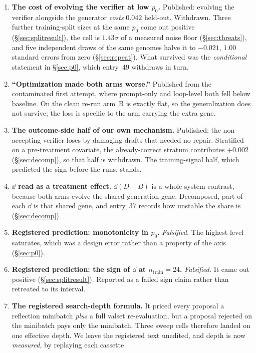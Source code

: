 \documentclass[11pt]{article}
\begin{document}
\begin{enumerate}\itemsep2pt
  \item \textbf{The cost of evolving the verifier at low $p_0$.} Published: evolving the verifier
    alongside the generator \emph{costs} $0.042$ held-out. Withdrawn. Three further
    training-split sizes at the same $p_0$ come out positive
    (\S\ref{sec:splitresult}), the cell is $1.43\sigma$ of a measured noise floor
    (\S\ref{sec:threats}), and five independent draws of the same genomes halve it to $-0.021$,
    $1.00$ standard errors from zero (\S\ref{sec:repeat}). What survived was the
    \emph{conditional} statement in \S\ref{sec:p0}, which entry~49 withdraws in turn.
  \item \textbf{``Optimization made both arms worse.''} Published from the contaminated first
    attempt, where prompt-only and loop-level both fell below baseline. On the clean re-run
    arm~B is exactly flat, so the generalization does not survive; the loss is specific to the
    arm carrying the extra gene.
  \item \textbf{The outcome-side half of our own mechanism.} Published: the non-accepting
    verifier loses by damaging drafts that needed no repair. Stratified on a pre-treatment
    covariate, the already-correct stratum contributes $+0.002$ (\S\ref{sec:decomp}), so that
    half is withdrawn. The training-signal half, which predicted the sign before the runs, stands.
  \item \textbf{$\dd$ read as a treatment effect.} $\dd(D-B)$ is a whole-system contrast, because
    both arms evolve the shared generation gene. Decomposed, part of each $\dd$ is that shared
    gene, and entry~37 records how unstable the share is (\S\ref{sec:decomp}).
  \item \textbf{Registered prediction: monotonicity in $p_0$.} \emph{Falsified.} The highest
    level saturates, which was a design error rather than a property of the axis
    (\S\ref{sec:p0}).
  \item \textbf{Registered prediction: the sign of $\dd$ at $n_{\mathrm{train}} = 24$.}
    \emph{Falsified.} It came out positive (\S\ref{sec:splitresult}). Reported as a failed sign
    claim rather than retreated to its interval.
  \item \textbf{The registered search-depth formula.} It priced every proposal a reflection
    minibatch \emph{plus} a full valset re-evaluation, but a proposal rejected on the minibatch
    pays only the minibatch. Three sweep cells therefore landed on one effective depth. We leave the registered text unedited, and depth is now \emph{measured}, by replaying each cassette

\end{enumerate}
\end{document}

